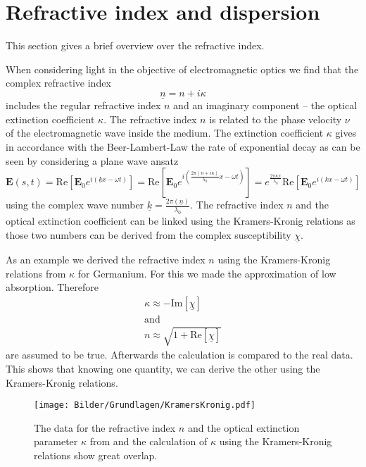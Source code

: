 \section{Refractive index and dispersion}
\label{sec:dispersion}

This section gives a brief overview over the refractive index.

When considering light in the objective of electromagnetic optics we find that the complex refractive index
\begin{equation}
    \underline{n} = n + i \kappa \label{eq:refindex}
\end{equation}
includes the  regular refractive index  $n$ and an imaginary component -- the optical extinction coefficient
 $\kappa$. The refractive index $n$ is related to the 
phase velocity $\nu$ of the electromagnetic wave inside the medium. The extinction coefficient $\kappa$ gives 
in accordance with the Beer-Lambert-Law the rate of exponential decay as can be seen
by considering a plane wave ansatz
\begin{equation}
    \mathbf{E}(s,t) = \mathrm{Re}[ \mathbf{E}_{0} e^{i( \underline{k} x-\omega t)}]  = 
    \mathrm{Re}[ \mathbf{E}_{0} e^{i( \frac{2 \pi (n + i \kappa)}{\lambda_0} x-\omega t)}] =
    e^{\frac{2 \pi \kappa x}{\lambda_0}}\mathrm{Re}[ \mathbf{E}_{0} e^{i( k x-\omega t)}]
\end{equation}
using the complex wave number $\underline{k} = \frac{2 \pi (\underline{n})}{\lambda_0}$. The refractive index $n$
and the optical extinction coefficient can be linked using the Kramers-Kronig relations as those two numbers can be 
derived from the complex susceptibility $\underline{\chi}$.

As an example we derived the refractive index $n$ using the Kramers-Kronig relations from $\kappa$ for Germanium. For this we made the
approximation of low absorption. Therefore 
\begin{gather*}
    \kappa \approx - \mathrm{Im}[\underline{\chi}]\\
    \mathrm{and}\\
    n \approx \sqrt{1 + \mathrm{Re}[\underline{\chi}]}
\end{gather*}
are assumed to be true. Afterwards the calculation is compared to the real data. This shows that knowing one quantity, we can derive the other using the Kramers-Kronig relations.

\begin{figure}
    \centering
    \texttt{[image: Bilder/Grundlagen/KramersKronig.pdf]}
    \caption{The data for the refractive index $n$ and the optical extinction parameter $\kappa$ from \cite{Nunley.2016} and the calculation of $\kappa$ using the Kramers-Kronig relations show great overlap.} 
\end{figure}

